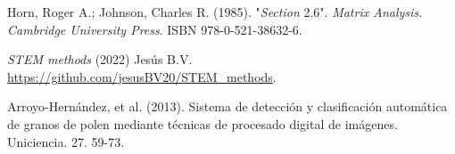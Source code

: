 \begin{thebibliography}{9}
Horn, Roger A.; Johnson, Charles R. (1985). "\textit{Section} 2.6". \textit{Matrix Analysis. Cambridge University Press}. ISBN 978-0-521-38632-6.

\textit{STEM methods} (2022) Jesús B.V. \url{https://github.com/jesusBV20/STEM_methods}.

Arroyo-Hernández, et al. (2013). Sistema de detección y clasificación automática de granos de polen mediante técnicas de procesado digital de imágenes. Uniciencia. 27. 59-73. 
\end{thebibliography}


